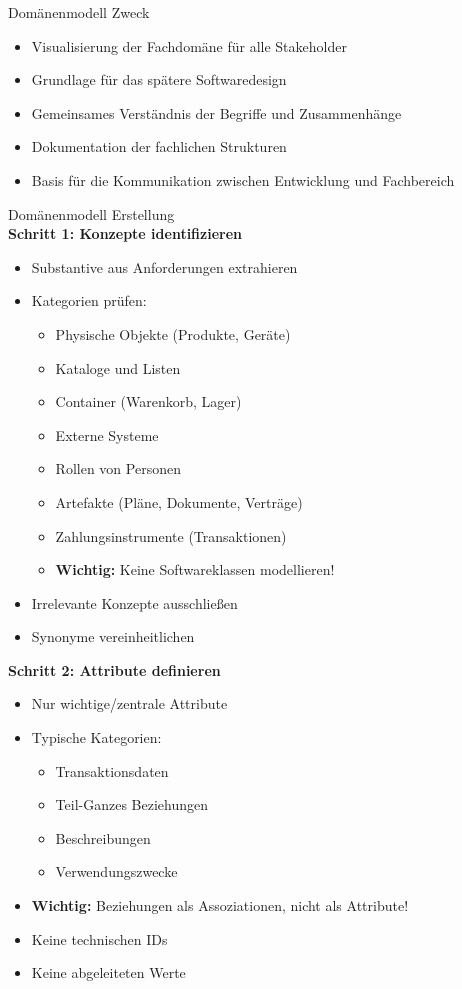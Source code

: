 \begin{concept}{Domänenmodell Zweck}
\begin{itemize}
    \item Visualisierung der Fachdomäne für alle Stakeholder
    \item Grundlage für das spätere Softwaredesign
    \item Gemeinsames Verständnis der Begriffe und Zusammenhänge
    \item Dokumentation der fachlichen Strukturen
    \item Basis für die Kommunikation zwischen Entwicklung und Fachbereich
\end{itemize}
\end{concept}

\begin{KR}{Domänenmodell Erstellung}\\
\textbf{Schritt 1: Konzepte identifizieren}
\begin{itemize}
    \item Substantive aus Anforderungen extrahieren
    \item Kategorien prüfen:
    \begin{itemize}
        \item Physische Objekte (Produkte, Geräte)
        \item Kataloge und Listen
        \item Container (Warenkorb, Lager)
        \item Externe Systeme
        \item Rollen von Personen
        \item Artefakte (Pläne, Dokumente, Verträge)
        \item Zahlungsinstrumente (Transaktionen)
        \item \textbf{Wichtig:} Keine Softwareklassen modellieren!
    \end{itemize}
    \item Irrelevante Konzepte ausschließen
    \item Synonyme vereinheitlichen
\end{itemize}

\textbf{Schritt 2: Attribute definieren}
\begin{itemize}
    \item Nur wichtige/zentrale Attribute
    \item Typische Kategorien:
    \begin{itemize}
        \item Transaktionsdaten
        \item Teil-Ganzes Beziehungen
        \item Beschreibungen
        \item Verwendungszwecke
    \end{itemize}
    \item \textbf{Wichtig:} Beziehungen als Assoziationen, nicht als Attribute!
    \item Keine technischen IDs
    \item Keine abgeleiteten Werte
\end{itemize}


\end{KR}
